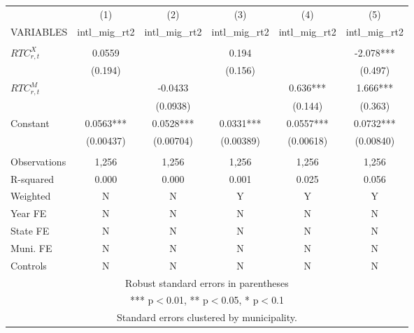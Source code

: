 \begin{tabular}{lccccc} \hline
 & (1) & (2) & (3) & (4) & (5) \\
VARIABLES & intl\_mig\_rt2 & intl\_mig\_rt2 & intl\_mig\_rt2 & intl\_mig\_rt2 & intl\_mig\_rt2 \\ \hline
 &  &  &  &  &  \\
$ RTC_{r,t}^X$ & 0.0559 &  & 0.194 &  & -2.078*** \\
 & (0.194) &  & (0.156) &  & (0.497) \\
$ RTC_{r,t}^M$ &  & -0.0433 &  & 0.636*** & 1.666*** \\
 &  & (0.0938) &  & (0.144) & (0.363) \\
Constant & 0.0563*** & 0.0528*** & 0.0331*** & 0.0557*** & 0.0732*** \\
 & (0.00437) & (0.00704) & (0.00389) & (0.00618) & (0.00840) \\
 &  &  &  &  &  \\
Observations & 1,256 & 1,256 & 1,256 & 1,256 & 1,256 \\
R-squared & 0.000 & 0.000 & 0.001 & 0.025 & 0.056 \\
Weighted & N & N & Y & Y & Y \\
Year FE & N & N & N & N & N \\
State FE & N & N & N & N & N \\
Muni. FE & N & N & N & N & N \\
 Controls & N & N & N & N & N \\ \hline
\multicolumn{6}{c}{ Robust standard errors in parentheses} \\
\multicolumn{6}{c}{ *** p$<$0.01, ** p$<$0.05, * p$<$0.1} \\
\multicolumn{6}{c}{ Standard errors clustered by municipality.} \\
\end{tabular}

